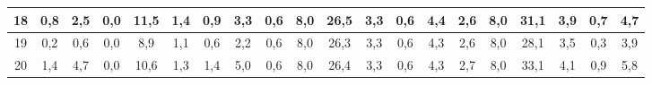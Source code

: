 \begin{sidewaystable}[]
\begin{tabular}{|c|c|c|c|c|c|c|c|c|c|c|c|c|c|c|c|c|c|c|c|}
    18 & 0,8                                             & 2,5                                             & 0,0                                             & 11,5                                             & 1,4                                              & 0,9                                              & 3,3                                              & 0,6                                              & 8,0                                              & 26,5                                             & 3,3                                              & 0,6                                              & 4,4                                              & 2,6                                              & 8,0                                              & 31,1                                             & 3,9                                              & 0,7                                              & 4,7                                              \\ \hline
    19 & 0,2                                             & 0,6                                             & 0,0                                             & 8,9                                              & 1,1                                              & 0,6                                              & 2,2                                              & 0,6                                              & 8,0                                              & 26,3                                             & 3,3                                              & 0,6                                              & 4,3                                              & 2,6                                              & 8,0                                              & 28,1                                             & 3,5                                              & 0,3                                              & 3,9                                              \\ \hline
    20 & 1,4                                             & 4,7                                             & 0,0                                             & 10,6                                             & 1,3                                              & 1,4                                              & 5,0                                              & 0,6                                              & 8,0                                              & 26,4                                             & 3,3                                              & 0,6                                              & 4,3                                              & 2,7                                              & 8,0                                              & 33,1                                             & 4,1                                              & 0,9                                              & 5,8                                              \\ \hline

\end{tabular}
\end{sidewaystable}
